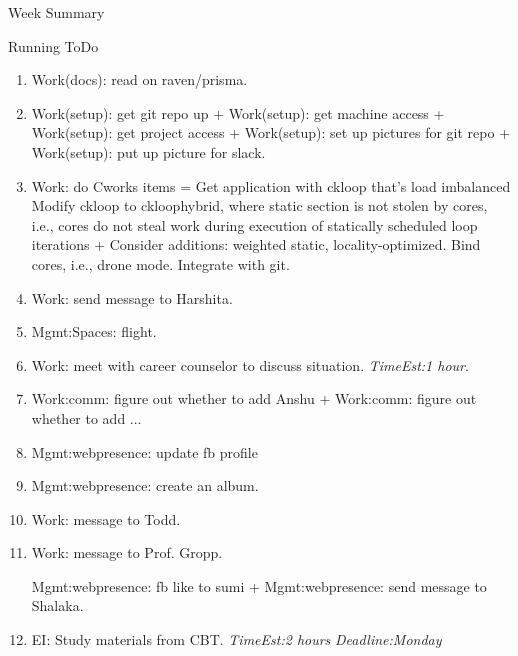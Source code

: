 \documentclass[serif, mathserif, final]{beamer}
\newcommand{\te}[1]{\textit{TimeEst:}\textit{#1}}
\newcommand{\dl}[1]{\textit{Deadline:}\textit{#1}}
\begin{document}
\begin{frame}
\begin{columns}
\begin{column}{0.5\linewidth}
\begin{block}{Week Summary}
  \end{block}

  \begin{block}{Running ToDo} %
    \begin{enumerate}

    \item \tiny Work(docs): read on raven/prisma. 
    \item \tiny Work(setup): get git repo up + Work(setup): get
      machine access + Work(setup): get project access + Work(setup):
      set up pictures for git repo + Work(setup): put up picture for slack.
 
    \item \tiny Work: do Cworks items = Get application with ckloop
      that’s load imbalanced Modify ckloop to 
      ckloophybrid, where static section is not stolen by cores, i.e.,
      cores do not steal work during execution of statically scheduled loop
      iterations +  Consider additions: weighted static,
      locality-optimized. Bind cores, i.e., drone mode.  Integrate
      with git.

    \item \tiny Work: send message to Harshita. 
    \item \tiny Mgmt:Spaces: flight. 


    \item \tiny Work: meet with career counselor to discuss
      situation. \te{1 hour}. 

    \item \tiny Work:comm: figure out whether to add Anshu +
      Work:comm: figure out whether to add ... 
    \item \tiny Mgmt:webpresence: update fb profile 
    \item \tiny Mgmt:webpresence: create an album.


    \item \tiny Work: message to Todd. 
    \item \tiny Work: message to Prof. Gropp. 

      Mgmt:webpresence: fb like to sumi +
      Mgmt:webpresence: send message to Shalaka. 
    \item \tiny EI: Study materials from CBT.  \te{2 hours}
      \dl{Monday} 

    \end{enumerate}
  \end{block}
 


\end{column}
\end{columns}
\end{frame}
\end{document}

